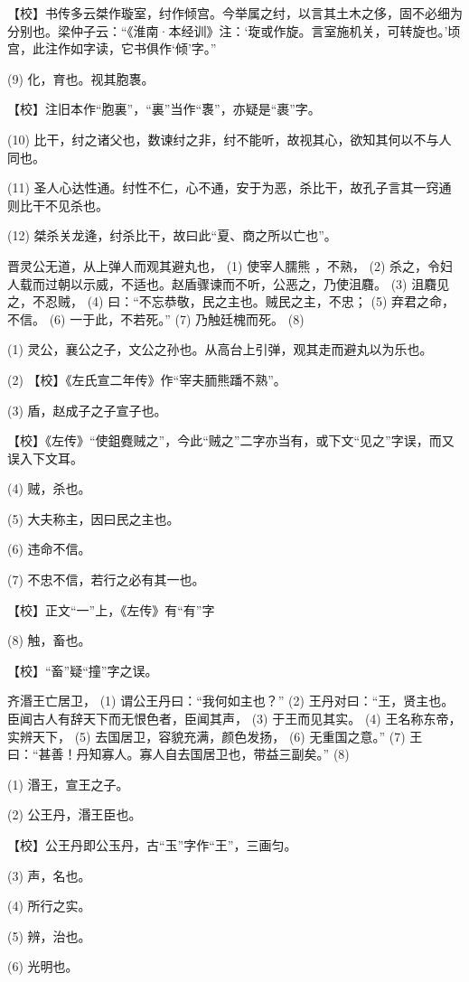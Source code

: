 \documentclass[12pt,UTF8]{ctexbook}
\begin{document}
【校】书传多云桀作璇室，纣作倾宫。今举属之纣，以言其土木之侈，固不必细为分别也。梁仲子云：“《淮南·本经训》注：‘琁或作旋。言室施机关，可转旋也。’顷宫，此注作如字读，它书俱作‘倾’字。”

(9) 化，育也。视其胞褢。

【校】注旧本作“胞裏”，“裏”当作“褢”，亦疑是“裹”字。

(10) 比干，纣之诸父也，数谏纣之非，纣不能听，故视其心，欲知其何以不与人同也。

(11) 圣人心达性通。纣性不仁，心不通，安于为恶，杀比干，故孔子言其一窍通则比干不见杀也。

(12) 桀杀关龙逄，纣杀比干，故曰此“夏、商之所以亡也”。

晋灵公无道，从上弹人而观其避丸也， (1) 使宰人臑熊 ，不熟， (2) 杀之，令妇人载而过朝以示威，不适也。赵盾骤谏而不听，公恶之，乃使沮麛。 (3) 沮麛见之，不忍贼， (4) 曰：“不忘恭敬，民之主也。贼民之主，不忠； (5) 弃君之命，不信。 (6) 一于此，不若死。” (7) 乃触廷槐而死。 (8)

(1) 灵公，襄公之子，文公之孙也。从高台上引弹，观其走而避丸以为乐也。

(2) 【校】《左氏宣二年传》作“宰夫胹熊蹯不熟”。

(3) 盾，赵成子之子宣子也。

【校】《左传》“使鉏麑贼之”，今此“贼之”二字亦当有，或下文“见之”字误，而又误入下文耳。

(4) 贼，杀也。

(5) 大夫称主，因曰民之主也。

(6) 违命不信。

(7) 不忠不信，若行之必有其一也。

【校】正文“一”上，《左传》有“有”字

(8) 触，畜也。

【校】“畜”疑“撞”字之误。

齐湣王亡居卫， (1) 谓公王丹曰：“我何如主也？” (2) 王丹对曰：“王，贤主也。臣闻古人有辞天下而无恨色者，臣闻其声， (3) 于王而见其实。 (4) 王名称东帝，实辨天下， (5) 去国居卫，容貌充满，颜色发扬， (6) 无重国之意。” (7) 王曰：“甚善！丹知寡人。寡人自去国居卫也，带益三副矣。” (8)

(1) 湣王，宣王之子。

(2) 公王丹，湣王臣也。

【校】公王丹即公玉丹，古“玉”字作“王”，三画匀。

(3) 声，名也。

(4) 所行之实。

(5) 辨，治也。

(6) 光明也。
\end{document}
